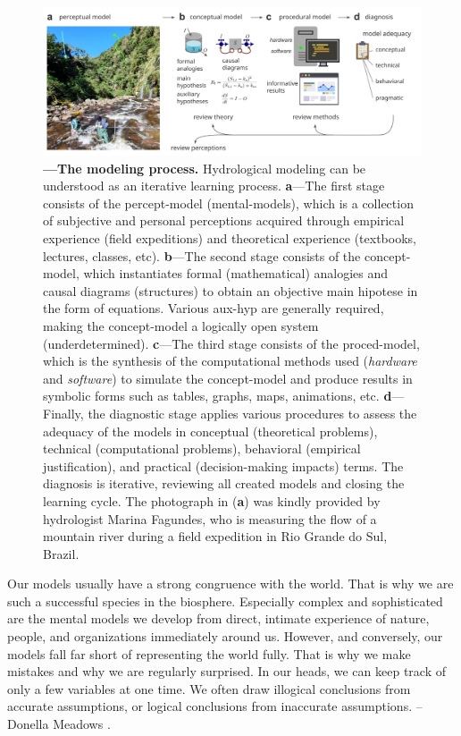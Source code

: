 \documentclass[./main_en.tex]{subfiles}
\begin{document}
\begin{figure}[t!] %
	\centering				
	\includegraphics[width=0.95\linewidth]{figs/fig_modelprocess_en.jpg}		
	\caption[The Modeling Process]
	{\textbf{---\;The modeling process.}
        Hydrological modeling can be understood as an iterative learning process. \;\textbf{a}\;---\;The first stage consists of the \gls{percept-model} (\gls{mental-models}), which is a collection of subjective and personal perceptions acquired through empirical experience (field expeditions) and theoretical experience (textbooks, lectures, classes, etc). \;\textbf{b}\;---\;The second stage consists of the \gls{concept-model}, which instantiates formal (mathematical) analogies and causal diagrams (structures) to obtain an objective main \gls{hipotese} in the form of equations. Various \gls{aux-hyp} are generally required, making the \gls{concept-model} a logically open \gls{system} (underdetermined). \;\textbf{c}\;---\;The third stage consists of the \gls{proced-model}, which is the synthesis of the computational methods used (\textit{hardware} and \textit{software}) to simulate the \gls{concept-model} and produce results in symbolic forms such as tables, graphs, maps, animations, etc. \;\textbf{d}\;---\;Finally, the diagnostic stage applies various procedures to assess the adequacy of the models in conceptual (theoretical problems), technical (computational problems), behavioral (empirical justification), and practical (decision-making impacts) terms. The diagnosis is iterative, reviewing all created models and closing the learning cycle. The photograph in (\textbf{a}) was kindly provided by hydrologist Marina Fagundes, who is measuring the flow of a mountain river during a field expedition in Rio Grande do Sul, Brazil.\;
	}
\label{fig:sys:process}  %
\end{figure}

\begin{adjustwidth}{100pt}{0pt}
\medskip
\small Our models usually have a strong congruence with the world. That is why we are such a successful species in the biosphere. Especially complex and sophisticated are the mental models we develop from direct, intimate experience of nature, people, and organizations immediately around us. However, and conversely, our models fall far short of representing the world fully. That is why we make mistakes and why we are regularly surprised. In our heads, we can keep track of only a few variables at one time. We often draw illogical conclusions from accurate assumptions, or logical conclusions from inaccurate assumptions. -- Donella Meadows \cite{meadows2008}.
\medskip
\end{adjustwidth}
\end{document}

